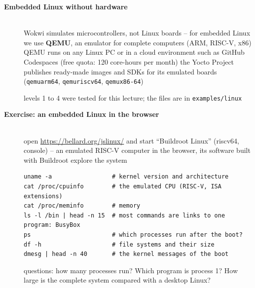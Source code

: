 \begin{description}
\item[{\rot\bf Embedded Linux without hardware}]~\\[-\lblskip]
\bi
	\ite Wokwi simulates microcontrollers, not Linux boards -- for embedded Linux we use \textbf{QEMU}, an emulator for complete computers (ARM, RISC-V, x86)
	\ite QEMU runs on any Linux PC or in a cloud environment such as GitHub Codespaces (free quota: 120 core-hours per month)
	\ite the Yocto Project publishes ready-made images and SDKs for its emulated boards (\texttt{qemuarm64}, \texttt{qemuriscv64}, \texttt{qemux86-64})
\ei
\begin{center}
\end{center}
\bi
	\ite levels 1 to 4 were tested for this lecture; the files are in \texttt{examples/linux}
\ei
\os{\newpage}

\item[{\rot\bf Exercise: an embedded Linux in the browser}]~\\[-\lblskip]
\bi
	\ite open \url{https://bellard.org/jslinux/} and start ``Buildroot Linux'' (riscv64, console) -- an emulated RISC-V computer in the browser, its software built with Buildroot
	\ite explore the system
\ei
\begin{lstlisting}[language={}]
uname -a                 # kernel version and architecture
cat /proc/cpuinfo        # the emulated CPU (RISC-V, ISA extensions)
cat /proc/meminfo        # memory
ls -l /bin | head -n 15  # most commands are links to one program: BusyBox
ps                       # which processes run after the boot?
df -h                    # file systems and their size
dmesg | head -n 40       # the kernel messages of the boot
\end{lstlisting}
\bi
	\ite questions: how many processes run? Which program is process 1? How large is the complete system compared with a desktop Linux?
\ei
\os{\newpage}


\end{description}
